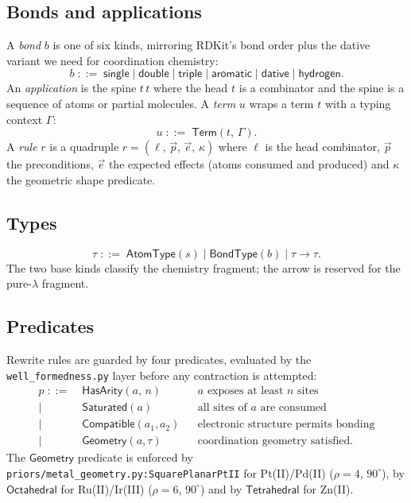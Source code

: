 \documentclass{article}
\theoremstyle{definition}
\begin{document}
\subsection{Bonds and applications}
A \emph{bond} $b$ is one of six kinds, mirroring RDKit's bond order plus the
dative variant we need for coordination chemistry:
\[
  b \;::=\; \mathsf{single} \mid \mathsf{double} \mid \mathsf{triple}
          \mid \mathsf{aromatic} \mid \mathsf{dative} \mid \mathsf{hydrogen}.
\]
An \emph{application} is the spine $t \, t$ where the head $t$ is a
combinator and the spine is a sequence of atoms or partial molecules.
A \emph{term} $u$ wraps a term $t$ with a typing context $\Gamma$:
\[
  u \;::=\; \mathsf{Term}(t,\,\Gamma).
\]
A \emph{rule} $r$ is a quadruple
$r = (\ell,\,\vec p,\,\vec e,\,\kappa)$ where $\ell$ is the head combinator,
$\vec p$ the preconditions, $\vec e$ the expected effects (atoms consumed and
produced) and $\kappa$ the geometric shape predicate.

\subsection{Types}
\[
  \tau \;::=\; \mathsf{AtomType}(s) \mid \mathsf{BondType}(b)
            \mid \tau \to \tau.
\]
The two base kinds classify the chemistry fragment; the arrow is reserved
for the pure-$\lambda$ fragment.

\subsection{Predicates}
Rewrite rules are guarded by four predicates, evaluated by the
\texttt{well\_formedness.py} layer before any contraction is attempted:
\begin{align*}
  p \;::=\;& \mathsf{HasArity}(a,\,n)        && a \text{ exposes at least } n \text{ sites} \\
           \mid\;& \mathsf{Saturated}(a)        && \text{all sites of } a \text{ are consumed} \\
           \mid\;& \mathsf{Compatible}(a_1,a_2) && \text{electronic structure permits bonding} \\
           \mid\;& \mathsf{Geometry}(a,\tau)    && \text{coordination geometry satisfied.}
\end{align*}
The $\mathsf{Geometry}$ predicate is enforced by
\texttt{priors/metal\_geometry.py:SquarePlanarPtII} for Pt(II)/Pd(II)
($\rho = 4$, $90^\circ$), by $\mathsf{Octahedral}$ for Ru(II)/Ir(III)
($\rho = 6$, $90^\circ$) and by $\mathsf{Tetrahedral}$ for Zn(II).
\end{document}
